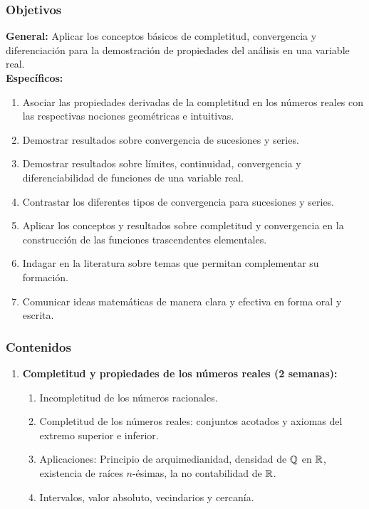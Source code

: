 \begin{refsection}
\subsubsection*{Objetivos}

\textbf{General:} Aplicar los conceptos básicos de completitud, convergencia y diferenciación para la demostración de propiedades del análisis en una variable real. \\

\textbf{Específicos:}

\begin{enumerate}
\item Asociar las propiedades derivadas de la completitud en los números reales con las respectivas nociones geométricas e intuitivas.
\item Demostrar resultados sobre convergencia de sucesiones y series.
\item Demostrar resultados sobre límites, continuidad, convergencia y diferenciabilidad de funciones de una variable real.
\item Contrastar los diferentes tipos de convergencia para sucesiones y series.
\item Aplicar los conceptos y resultados sobre completitud y convergencia en la construcción de las funciones trascendentes elementales.
\item Indagar en la literatura sobre temas que permitan complementar su formación.
\item Comunicar ideas matemáticas de manera clara y efectiva en forma oral y escrita.
\end{enumerate}

\subsubsection*{Contenidos}

\begin{enumerate}
\item \textbf{Completitud y propiedades de los números reales (2 semanas):} 
\begin{enumerate}
    \item Incompletitud de los números racionales.
    \item Completitud de los números reales: conjuntos acotados y axiomas del extremo superior e inferior.
    \item Aplicaciones: Principio de arquimedianidad, densidad de $\mathbb{Q}$ en $\mathbb{R}$, existencia de raíces $n$-ésimas, la no contabilidad de $\mathbb{R}$.
    \item Intervalos, valor absoluto, vecindarios y cercanía. 
\end{enumerate}


\end{enumerate}
\end{refsection}
